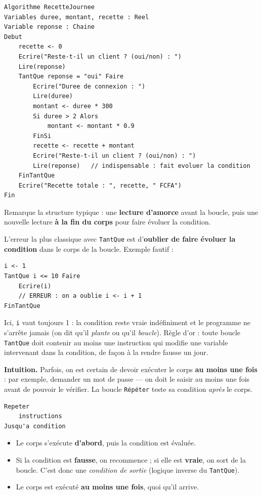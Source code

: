 \documentclass[11pt]{article}
\newcounter{popsec}
\newcounter{popsub}
\newcommand{\courssub}[1]{%
  \stepcounter{popsub}%
  \par\vspace{9pt}\noindent{\popxbold\fontsize{11.5}{13}\selectfont\color{popink}{\color{poporange}\thepopsec.\thepopsub}\hspace{6pt}#1}\par\nopagebreak\vspace{4pt}
}
\begin{document}
\begin{exemplebox}
\begin{lstlisting}
Algorithme RecetteJournee
Variables duree, montant, recette : Reel
Variable reponse : Chaine
Debut
    recette <- 0
    Ecrire("Reste-t-il un client ? (oui/non) : ")
    Lire(reponse)
    TantQue reponse = "oui" Faire
        Ecrire("Duree de connexion : ")
        Lire(duree)
        montant <- duree * 300
        Si duree > 2 Alors
            montant <- montant * 0.9
        FinSi
        recette <- recette + montant
        Ecrire("Reste-t-il un client ? (oui/non) : ")
        Lire(reponse)   // indispensable : fait evoluer la condition
    FinTantQue
    Ecrire("Recette totale : ", recette, " FCFA")
Fin
\end{lstlisting}
Remarque la structure typique : une \textbf{lecture d'amorce} avant la boucle, puis une nouvelle lecture \textbf{à la fin du corps} pour faire évoluer la condition.
\end{exemplebox}

\begin{attention}
L'erreur la plus classique avec \texttt{TantQue} est d'\textbf{oublier de faire évoluer la condition} dans le corps de la boucle. Exemple fautif :
\begin{lstlisting}
i <- 1
TantQue i <= 10 Faire
    Ecrire(i)
    // ERREUR : on a oublie i <- i + 1
FinTantQue
\end{lstlisting}
Ici, \texttt{i} vaut toujours 1 : la condition reste vraie indéfiniment et le programme ne s'arrête jamais (on dit qu'il \emph{plante} ou qu'il \emph{boucle}). Règle d'or : toute boucle \texttt{TantQue} doit contenir au moins une instruction qui modifie une variable intervenant dans la condition, de façon à la rendre fausse un jour.
\end{attention}

\courssub{La boucle Répéter ... Jusqu'à}

\textbf{Intuition.} Parfois, on est certain de devoir exécuter le corps \textbf{au moins une fois} : par exemple, demander un mot de passe — on doit le saisir au moins une fois avant de pouvoir le vérifier. La boucle \texttt{Répéter} teste sa condition \emph{après} le corps.

\begin{propriete}
\begin{lstlisting}
Repeter
    instructions
Jusqu'a condition
\end{lstlisting}
\begin{itemize}
\item Le corps s'exécute \textbf{d'abord}, puis la condition est évaluée.
\item Si la condition est \textbf{fausse}, on recommence ; si elle est \textbf{vraie}, on sort de la boucle. C'est donc une \emph{condition de sortie} (logique inverse du \texttt{TantQue}).
\item Le corps est exécuté \textbf{au moins une fois}, quoi qu'il arrive.
\end{itemize}
\end{propriete}
\end{document}
